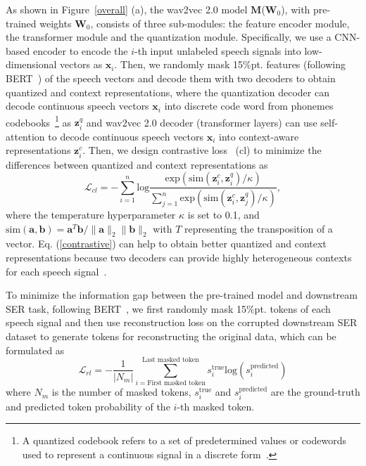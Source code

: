 \documentclass{article}
\begin{document}
As shown in Figure~\ref{overall} (a), the wav2vec 2.0 model $\mathbf{M}$($\mathbf{W}_{0}$), with pre-trained weights $\mathbf{W}_{0}$, consists of three sub-modules: the feature encoder module, the transformer module and the quantization module.
Specifically, we use a CNN-based encoder to encode the $i$-th input unlabeled speech signals into low-dimensional vectors as $\mathbf{x}_{i}$. Then, we randomly mask 15\%pt. features (following BERT~\cite{kenton2019bert}) of the speech vectors and decode them with two decoders to obtain quantized and context representations, where the quantization decoder can decode continuous speech vectors $\mathbf{x}_i$ into discrete code word from phonemes codebooks~\footnote{A quantized codebook refers to a set of predetermined values or codewords used to represent a continuous signal in a discrete form~\cite{baevski2020wav2vec}.} as $\mathbf{z}_{i}^{q}$ and wav2vec 2.0 decoder (transformer layers) can use self-attention to decode continuous speech vectors $\mathbf{x}_{i}$ into context-aware representations $\mathbf{z}_{i}^{c}$. 
%
Then, we design contrastive loss~\cite{baevski2020wav2vec} (cl) to minimize the differences between quantized and context representations as
\begin{equation}
\label{contrastive}
    \mathcal{L}_{cl} = -\sum_{i=1}^{n}\text{log}\frac{\text{exp}(\text{sim}(\mathbf{z}_{i}^{c}, \mathbf{z}_{i}^{q})/\kappa)}{\sum_{j=1}^{n}\text{exp}(\text{sim}(\mathbf{z}_{i}^{c}, \mathbf{z}_{j}^{q})/\kappa)},
\end{equation}
where the temperature hyperparameter $\kappa$ is set to 0.1,  and $\text{sim}(\mathbf{a}, \mathbf{b}) = \mathbf{a}^{T}\mathbf{b}/\|\mathbf{a}\|_{2}\|\mathbf{b}\|_{2}$ with $T$ representing the transposition of a vector.
Eq. (\ref{contrastive}) can help to obtain better quantized and context representations because two decoders can provide highly heterogeneous contexts for each speech signal~\cite{YouCSCWS20}. 


To minimize the information gap between the pre-trained model and downstream SER task, following BERT~\cite{kenton2019bert}, we first randomly mask 15\%pt. tokens of each speech signal and then use reconstruction loss on the corrupted downstream SER dataset to generate tokens for reconstructing the original data, which can be formulated as
\begin{equation}
    \mathcal{L}_{rl} = - \frac{1}{|N_{m}|}\sum_{i=\text{First masked token}}^{\text{Last masked token}} s^{\text{true}}_{i}\text{log}(s_{i}^{\text{predicted}})
\end{equation}
where $N_{m}$ is the number of masked tokens, $s^{\text{true}}_{i}$ and $s_{i}^{\text{predicted}}$ are the ground-truth and predicted token probability of the $i$-th masked token.
\end{document}
